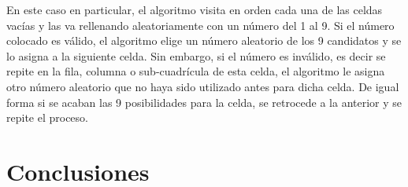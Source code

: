 \documentclass[conference]{IEEEtran}
\begin{document}
En este caso en particular, el algoritmo visita en orden cada una de las celdas vacías y las va rellenando aleatoriamente con un número del 1 al 9. Si el número colocado es válido, el algoritmo elige un número aleatorio de los 9 candidatos y se lo asigna a la siguiente celda. Sin embargo, si el número es inválido, es decir se repite en la fila, columna o sub-cuadrícula de esta celda, el algoritmo le asigna otro número aleatorio que no haya sido utilizado antes para dicha celda. De igual forma si se acaban las 9 posibilidades para la celda, se retrocede a la anterior y se repite el proceso.

\section{Conclusiones}
\begin{otherlanguage}{spanish}
\printbibliography %
\end{otherlanguage}
\end{document}
